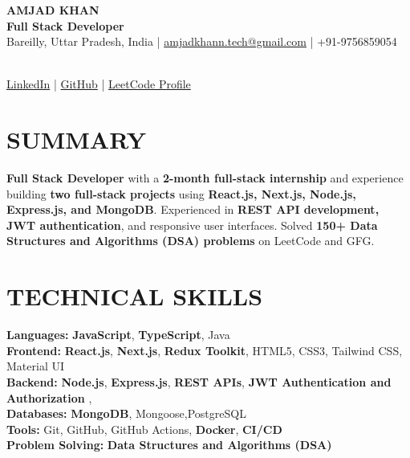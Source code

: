 \documentclass[10pt,a4paper]{article}
\begin{document}
\begin{center}

    {\LARGE \textbf{AMJAD KHAN}} \\[3pt]

    {\large \textbf{Full Stack Developer}} \\[5pt]

    Bareilly, Uttar Pradesh, India
    \quad | \quad
    \href{mailto:amjadkhann.tech@gmail.com}
    {amjadkhann.tech@gmail.com}
    \quad | \quad
    +91-9756859054

    \\[3pt]

    \href{https://www.linkedin.com/in/amjad-khan-209363320/}
    {LinkedIn}
    \quad | \quad
    \href{https://github.com/Amjadkhan9756}
    {GitHub}
    \quad | \quad
    \href{https://leetcode.com/u/amjadkhan9756/}
    {LeetCode Profile}

\end{center}

\section{SUMMARY}

\textbf{Full Stack Developer} with a \textbf{2-month full-stack internship}
and experience building \textbf{two full-stack projects} using
\textbf{React.js, Next.js, Node.js, Express.js, and MongoDB}.
Experienced in \textbf{REST API development, JWT authentication},
and responsive user interfaces. Solved \textbf{150+ Data Structures
and Algorithms (DSA) problems} on LeetCode and GFG.

\section{TECHNICAL SKILLS}

\textbf{Languages:} \textbf{JavaScript}, \textbf{TypeScript}, Java\\
\textbf{Frontend:} \textbf{React.js}, \textbf{Next.js}, \textbf{Redux Toolkit}, HTML5, CSS3, Tailwind CSS, Material UI\\
\textbf{Backend:} \textbf{Node.js}, \textbf{Express.js}, \textbf{REST APIs}, \textbf{JWT Authentication and Authorization },\\
\textbf{Databases:} \textbf{MongoDB}, Mongoose,PostgreSQL\\
\textbf{Tools:} Git, GitHub, GitHub Actions, \textbf{Docker}, \textbf{CI/CD}\\
\textbf{Problem Solving:} \textbf{Data Structures and Algorithms (DSA)}
\end{document}
